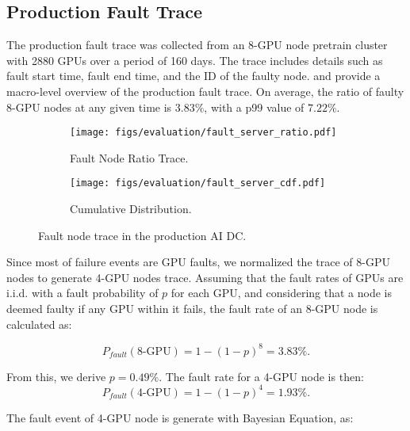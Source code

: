 \clearpage
\begin{appendices}

\section{Production Fault Trace}
\label{appendix:production-fault-trace}
The production fault trace was collected from an 8-GPU node pretrain cluster with 2880 GPUs over a period of 160 days. The trace includes details such as fault start time, fault end time, and the ID of the faulty node.  and  provide a macro-level overview of the production fault trace. On average, the ratio of faulty 8-GPU nodes at any given time is $3.83\%$, with a p99 value of $7.22\%$.

\begin{figure}[h!t]
    \centering
    \begin{subfigure}[b]{0.23\textwidth}
        \centering
        \texttt{[image: figs/evaluation/fault\_server\_ratio.pdf]}
        \caption{Fault Node Ratio Trace.}
        \label{fig:simulation:trace:timetrace}
    \end{subfigure}
    \hspace{2pt}
    \begin{subfigure}[b]{0.23\textwidth}
        \centering
        \texttt{[image: figs/evaluation/fault\_server\_cdf.pdf]}
        \caption{Cumulative Distribution.}
        \label{fig:simulation:trace:cdf}
    \end{subfigure}
    \vspace{-2ex}
    \caption{Fault node trace in the production AI DC.}
    \label{fig:simulation:trace}
\end{figure}

Since most of failure events are GPU faults, we normalized the trace of 8-GPU nodes to generate 4-GPU nodes trace. Assuming that the fault rates of GPUs are i.i.d. with a fault probability of $p$ for each GPU, and considering that a node is deemed faulty if any GPU within it fails, the fault rate of an 8-GPU node is calculated as:  

\vspace{-1em}
$$
P_{fault}(8\text{-GPU}) = 1 - (1-p)^8 = 3.83\%.
$$  

From this, we derive $p = 0.49\%$. The fault rate for a 4-GPU node is then:  
$$
P_{fault}(4\text{-GPU}) = 1 - (1-p)^4 = 1.93\%.
$$  

The fault event of 4-GPU node is generate with Bayesian Equation, as:



\end{appendices}
